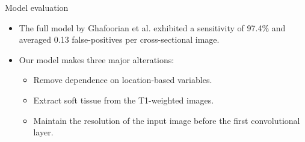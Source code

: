 \documentclass{beamer}
\begin{document}
\begin{frame}{Model evaluation}
\begin{itemize}
    \begin{block}{Sensitivity and Specificity}
	\[
		Sensitivity = \mathbb{P}(Correct | Positive)
	\]
	\[
		Specificity = \mathbb{P}(Correct | Negative)
	\]
    \end{block}
\item The full model by Ghafoorian et al. exhibited a sensitivity of 97.4\% and averaged 0.13 false-positives per cross-sectional image.
\pause
\item Our model makes three major alterations:
\begin{itemize}
\item Remove dependence on location-based variables.
\item Extract soft tissue from the T1-weighted images.
\item Maintain the resolution of the input image before the first convolutional layer.
\end{itemize}
\end{itemize}

\end{frame}


\end{document}
